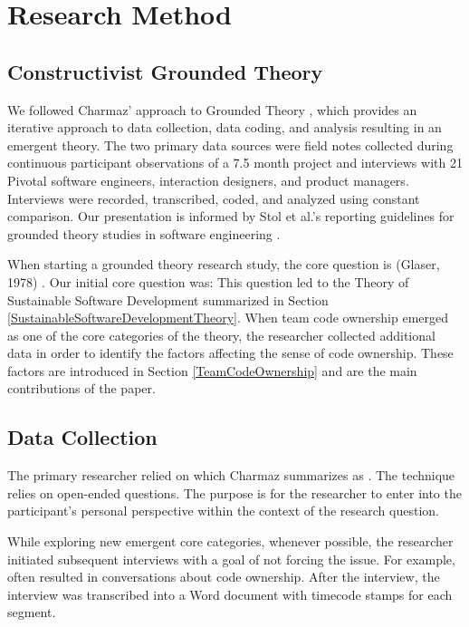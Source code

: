 \section{Research Method}
\label{ResearchMethod}

\subsection{Constructivist Grounded Theory}
We followed Charmaz' approach to Grounded Theory \cite{Charmaz}, which provides an iterative approach to data collection, data coding, and analysis resulting in an emergent theory. The two primary data sources were field notes collected during continuous participant observations of a 7.5 month project and interviews with 21 Pivotal software engineers, interaction designers, and product managers. Interviews were recorded, transcribed, coded, and analyzed using constant comparison. Our presentation is informed by Stol et al.'s reporting guidelines for grounded theory studies in software engineering \cite{StolGTinSE}. 

When starting a grounded theory research study, the core question is  (Glaser, 1978) \cite{GlaserTheoreticalSensitivity}. Our initial core question was:  This question led to the Theory of Sustainable Software Development summarized in Section \ref{SustainableSoftwareDevelopmentTheory}. When team code ownership emerged as one of the core categories of the theory, the researcher collected additional data in order to identify the factors affecting the sense of code ownership. These factors are introduced in Section \ref{TeamCodeOwnership} and are the main contributions of the paper.

\subsection{Data Collection}
The primary researcher relied on  which Charmaz summarizes as  \cite{Charmaz}. The technique relies on open-ended questions. The purpose is for the researcher to enter into the participant's personal perspective within the context of the research question. 

While exploring new emergent core categories, whenever possible, the researcher initiated subsequent interviews with a goal of not forcing the issue. For example,  often resulted in conversations about code ownership. After the interview, the interview was transcribed into a Word document with timecode stamps for each segment.

